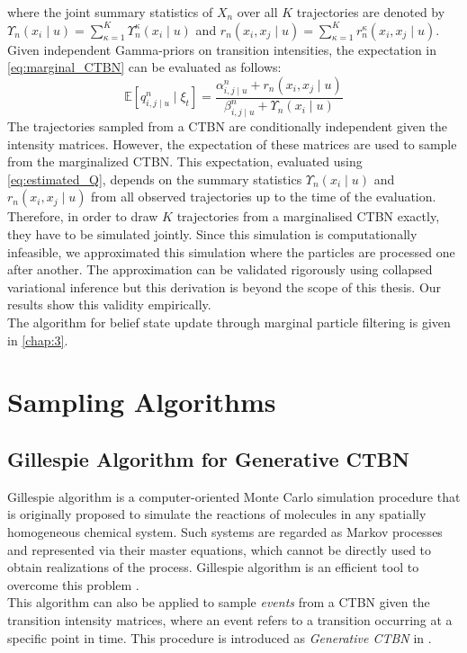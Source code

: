 where the joint summary statistics of $ X_n $ over all $ K $ trajectories are denoted by  $ \Upsilon_{n}(x_i\mid u) = \sum_{\kappa=1}^{K} \Upsilon_{n}^\kappa(x_i\mid u) $ and $ r_{n}(x_i, x_j\mid u) =\sum_{\kappa=1}^{K} r_{n}^\kappa(x_i, x_j\mid u)$.\\
Given independent Gamma-priors on transition intensities, the expectation in \autoref{eq:marginal_CTBN} can be evaluated as follows:
\begin{equation}
\mathbb{E}\left[q_{i,j\mid u}^{n} \mid \xi_{t}\right]=\frac{\alpha^n_{i,j\mid u}+r_{n}(x_i, x_j\mid u)}{\beta^n_{i,j\mid u}+\Upsilon_{n}(x_i \mid u)}
\label{eq:estimated_Q}
\end{equation}
The trajectories sampled from a CTBN are conditionally independent given the intensity matrices. However, the expectation of these matrices are used to sample from the marginalized CTBN. This expectation, evaluated using \autoref{eq:estimated_Q}, depends on the summary statistics $\Upsilon_{n}(x_i\mid u)$ and $ r_{n}(x_i, x_j\mid u)$ from all observed trajectories up to the time of the evaluation. Therefore, in order to draw $K$ trajectories from a marginalised CTBN exactly, they have to be simulated jointly. Since this simulation is computationally infeasible, we approximated this simulation where the particles are processed one after another. The approximation can be validated rigorously using collapsed variational inference but this derivation is beyond the scope of this thesis. Our results show this validity empirically. \\
The algorithm for belief state update through marginal particle filtering is given in \cref{chap:3}. 

\section{Sampling Algorithms}
\label{sec:sampling_alg}
\subsection{Gillespie Algorithm for Generative CTBN}
Gillespie algorithm is a computer-oriented Monte Carlo simulation procedure that is originally proposed to simulate the reactions of molecules in any spatially homogeneous chemical system. Such systems are regarded as Markov processes and represented via their master equations, which cannot be directly used to obtain realizations of the process. Gillespie algorithm is an efficient tool to overcome this problem \cite{Gillespie1976}.\\
This algorithm can also be applied to sample \textit{events} from a CTBN given the transition intensity matrices, where an event refers to a transition occurring at a specific point in time. This procedure is introduced as \textit{Generative CTBN} in \cite{Nodelman1995}.

